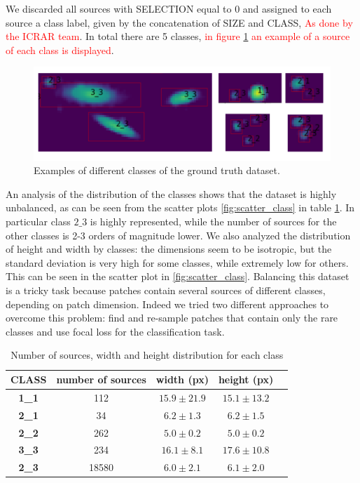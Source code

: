 \documentclass[a4paper,10pt]{report}
\begin{document}
We discarded all sources with SELECTION equal to 0 and assigned to each source a class label, given by the concatenation of SIZE and CLASS, \textcolor{red}{As done by the ICRAR team}.
 In total there are 5 classes, \textcolor{red}{ in figure \ref{fig:class_examples} an example of a source of each class is displayed}. 
 \begin{figure}[h]
  \center
  \includegraphics[width=0.90\linewidth]{diff_classes_examples.png}
  \caption{Examples of different classes of the ground truth dataset.}
  \label{fig:class_examples}
\end{figure}

An analysis of the distribution of the classes shows that the dataset is highly unbalanced, as can be seen from the scatter plots \ref{fig:scatter_class} in table \ref{table:class_analysis}. In particular class $2\_3$ is highly represented, while the number of sources for the other classes is 2-3 orders of magnitude lower. We also analyzed the distribution of height and width by classes: the dimensions seem to be isotropic, but the standard deviation is very high for some classes, while extremely low for others. This can be seen in the scatter plot in \ref{fig:scatter_class}.
Balancing this dataset is a tricky task because patches contain several sources of different classes, depending on patch dimension. Indeed we tried two different approaches to overcome this problem: find and re-sample patches that contain only the rare classes and use focal loss for the classification task.
\begin{table}[h]
  \center
  \begin{tabular}{|c|c|c|c|c|}
    \hline
    \textbf{CLASS}& \textbf{number of sources} & \textbf{width (px)} & \textbf{height (px)} \\ 
    \hline
    \textbf{1_1} & 112 & $15.9\pm21.9$ & $15.1\pm13.2$ \\ 
    \hline
    \textbf{2_1} & 34 & $6.2\pm1.3$ & $6.2\pm1.5$ \\ 
    \hline
    \textbf{2_2} & 262 & $5.0\pm0.2$ & $5.0\pm0.2$ \\ 
    \hline
    \textbf{3_3} & 234 & $16.1\pm8.1$ & $17.6\pm10.8$ \\ 
    \hline
    \textbf{2_3} & 18580 & $6.0\pm2.1$ & $6.1\pm2.0$ \\ 
    \hline
  \end{tabular}
  \caption{Number of sources, width and height distribution for each class}
  \label{table:class_analysis}
\end{table}
\end{document}
